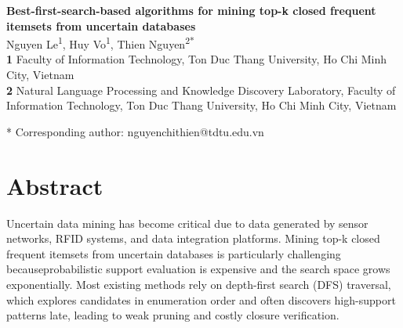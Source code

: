 \documentclass[10pt,letterpaper]{article}
\begin{document}
\vspace*{0.2in}

\begin{flushleft}
{\Large
\textbf{Best-first-search-based algorithms for mining top-k closed frequent itemsets from uncertain databases} %
}
\newline
\\
Nguyen Le\textsuperscript{1},
Huy Vo\textsuperscript{1},
Thien Nguyen\textsuperscript{2*}
\\
\bigskip
\textbf{1} Faculty of Information Technology, Ton Duc Thang University, Ho Chi Minh City, Vietnam
\\
\textbf{2} Natural Language Processing and Knowledge Discovery Laboratory, Faculty of Information Technology, Ton Duc Thang University, Ho Chi Minh City, Vietnam
\\
\bigskip

* Corresponding author: nguyenchithien@tdtu.edu.vn

\end{flushleft}


%
\section*{Abstract}
Uncertain data mining has become critical due to data generated by sensor
networks, RFID systems, and data integration platforms. Mining top-k closed frequent itemsets from uncertain databases is particularly challenging becauseprobabilistic support evaluation is expensive and the search space grows exponentially. Most existing methods rely on depth-first search (DFS) traversal, which explores candidates in enumeration order and often discovers high-support patterns late, leading to weak pruning and costly closure
verification.
\end{document}
